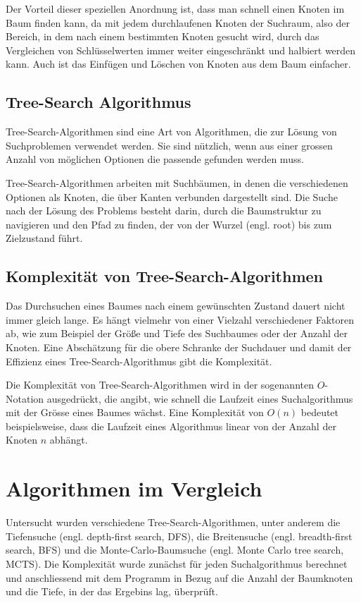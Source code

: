 \documentclass[a4paper,11pt]{article}
\begin{document}
Der Vorteil dieser speziellen Anordnung ist, dass man schnell einen Knoten im Baum finden kann, da mit jedem durchlaufenen Knoten der Suchraum, also der Bereich, in dem nach einem bestimmten Knoten gesucht wird, durch das Vergleichen von Schlüsselwerten immer weiter eingeschränkt und halbiert werden kann. Auch ist das Einfügen und Löschen von Knoten aus dem Baum einfacher. 

\subsection{Tree-Search Algorithmus}
Tree-Search-Algorithmen sind eine Art von Algorithmen, die zur Lösung von Suchproblemen verwendet werden. Sie sind nützlich, wenn aus einer grossen Anzahl von möglichen Optionen die passende gefunden werden muss.

Tree-Search-Algorithmen arbeiten mit Suchbäumen, in denen die verschiedenen Optionen als Knoten, die über Kanten verbunden dargestellt sind. Die Suche nach der Lösung des Problems besteht darin, durch die Baumstruktur zu navigieren und den Pfad zu finden, der von der Wurzel (engl. root) bis zum Zielzustand führt.

\subsection{Komplexität von Tree-Search-Algorithmen}
Das Durchsuchen eines Baumes nach einem gewünschten Zustand dauert nicht immer gleich lange. Es hängt vielmehr von einer Vielzahl verschiedener Faktoren ab, wie zum Beispiel der Größe und Tiefe des Suchbaumes oder der Anzahl der Knoten. Eine Abschätzung für die obere Schranke der Suchdauer und damit der Effizienz eines Tree-Search-Algorithmus gibt die Komplexität. 

Die Komplexität von Tree-Search-Algorithmen wird in der sogenannten $O$-Notation ausgedrückt, die angibt, wie schnell die Laufzeit eines Suchalgorithmus mit der Grösse eines Baumes wächst. Eine Komplexität von $O(n)$ bedeutet beispielsweise, dass die Laufzeit eines Algorithmus linear von der Anzahl der Knoten $n$ abhängt.

\section{Algorithmen im Vergleich}
Untersucht wurden verschiedene Tree-Search-Algorithmen, unter anderem die Tiefensuche (engl. depth-first search, DFS), die Breitensuche (engl. breadth-first search, BFS) und die Monte-Carlo-Baumsuche (engl. Monte Carlo tree search, MCTS). Die Komplexität wurde zunächst für jeden Suchalgorithmus berechnet und anschliessend mit dem Programm in Bezug auf die Anzahl der Baumknoten und die Tiefe, in der das Ergebins lag, überprüft.
\end{document}

